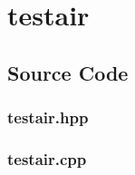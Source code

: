 \section{testair}
\label{sec:ltestair}


\subsection{Source Code}
\subsubsection{testair.hpp}
\pagebreak
\subsubsection{testair.cpp}
\pagebreak
